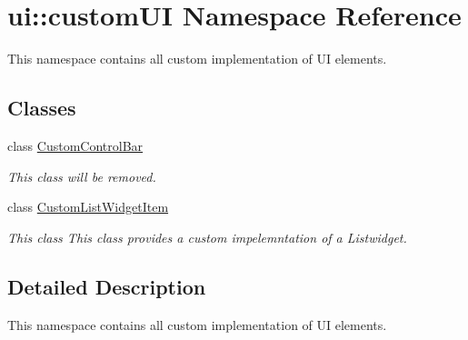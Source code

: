 \hypertarget{namespaceui_1_1custom_u_i}{}\section{ui\+:\+:custom\+UI Namespace Reference}
\label{namespaceui_1_1custom_u_i}


This namespace contains all custom implementation of UI elements.  


\subsection*{Classes}
\begin{DoxyCompactItemize}
\item 
class \mbox{\hyperlink{classui_1_1custom_u_i_1_1_custom_control_bar}{Custom\+Control\+Bar}}
\begin{DoxyCompactList}\small\item\em This class will be removed. \end{DoxyCompactList}\item 
class \mbox{\hyperlink{classui_1_1custom_u_i_1_1_custom_list_widget_item}{Custom\+List\+Widget\+Item}}
\begin{DoxyCompactList}\small\item\em This class This class provides a custom impelemntation of a Listwidget. \end{DoxyCompactList}\end{DoxyCompactItemize}


\subsection{Detailed Description}
This namespace contains all custom implementation of UI elements. 